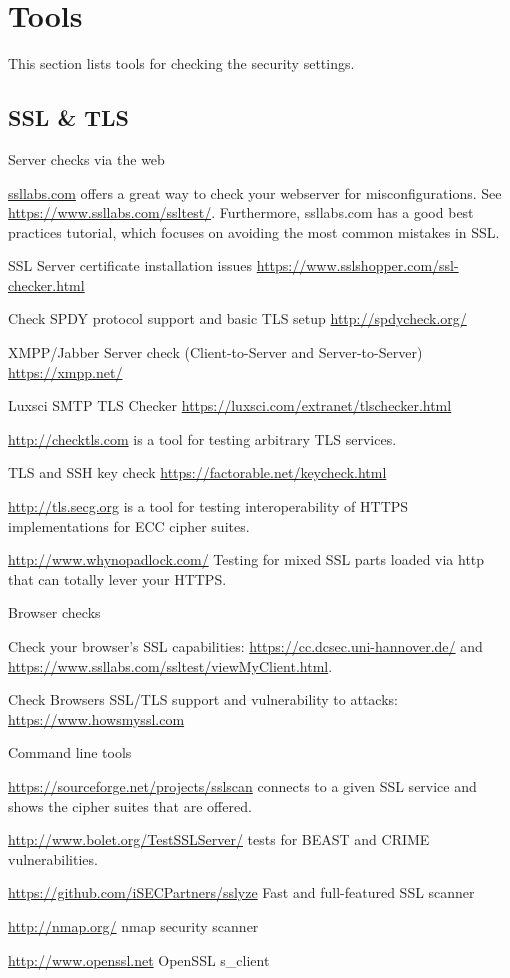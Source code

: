\chapter{Tools}
\label{cha:tools}
This section lists tools for checking the security settings.

\section{SSL \& TLS}

Server checks via the web
\begin{itemize*}
  \item \href{https://ssllabs.com}{ssllabs.com} offers a great way to check your webserver for misconfigurations. See \url{https://www.ssllabs.com/ssltest/}. Furthermore, ssllabs.com has a good best practices tutorial, which focuses on avoiding the most common mistakes in SSL.
  \item SSL Server certificate installation issues \url{https://www.sslshopper.com/ssl-checker.html}
  \item Check SPDY protocol support and basic TLS setup \url{http://spdycheck.org/}
  \item XMPP/Jabber Server check (Client-to-Server and Server-to-Server) \url{https://xmpp.net/}
  \item Luxsci SMTP TLS Checker \url{https://luxsci.com/extranet/tlschecker.html}
  \item \url{http://checktls.com} is a tool for testing arbitrary TLS services.
  \item TLS and SSH key check \url{https://factorable.net/keycheck.html}
  \item \url{http://tls.secg.org} is a tool for testing interoperability of HTTPS implementations for ECC cipher suites.
  \item \url{http://www.whynopadlock.com/} Testing for mixed SSL parts loaded via http that can totally lever your HTTPS.
\end{itemize*}

Browser checks
\begin{itemize*}
  \item Check your browser's SSL capabilities: \url{https://cc.dcsec.uni-hannover.de/} and \url{https://www.ssllabs.com/ssltest/viewMyClient.html}.
  \item Check Browsers SSL/TLS support and vulnerability to attacks: \url{https://www.howsmyssl.com}
\end{itemize*}


Command line tools
\begin{itemize*}
  \item \url{https://sourceforge.net/projects/sslscan} connects to a given SSL service and shows the cipher suites that are offered.
  \item \url{http://www.bolet.org/TestSSLServer/} tests for BEAST and CRIME vulnerabilities.
  \item \url{https://github.com/iSECPartners/sslyze} Fast and full-featured SSL scanner
  \item \url{http://nmap.org/} nmap security scanner
  \item \url{http://www.openssl.net} OpenSSL s\_client
\end{itemize*}


